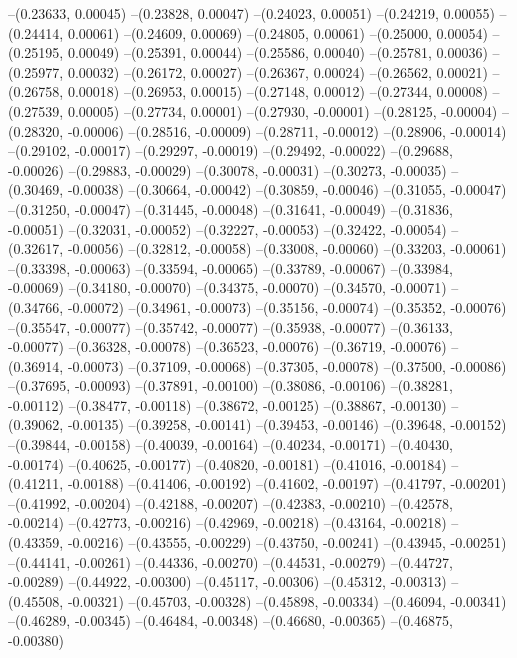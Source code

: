 --(0.23633, 0.00045)
--(0.23828, 0.00047)
--(0.24023, 0.00051)
--(0.24219, 0.00055)
--(0.24414, 0.00061)
--(0.24609, 0.00069)
--(0.24805, 0.00061)
--(0.25000, 0.00054)
--(0.25195, 0.00049)
--(0.25391, 0.00044)
--(0.25586, 0.00040)
--(0.25781, 0.00036)
--(0.25977, 0.00032)
--(0.26172, 0.00027)
--(0.26367, 0.00024)
--(0.26562, 0.00021)
--(0.26758, 0.00018)
--(0.26953, 0.00015)
--(0.27148, 0.00012)
--(0.27344, 0.00008)
--(0.27539, 0.00005)
--(0.27734, 0.00001)
--(0.27930, -0.00001)
--(0.28125, -0.00004)
--(0.28320, -0.00006)
--(0.28516, -0.00009)
--(0.28711, -0.00012)
--(0.28906, -0.00014)
--(0.29102, -0.00017)
--(0.29297, -0.00019)
--(0.29492, -0.00022)
--(0.29688, -0.00026)
--(0.29883, -0.00029)
--(0.30078, -0.00031)
--(0.30273, -0.00035)
--(0.30469, -0.00038)
--(0.30664, -0.00042)
--(0.30859, -0.00046)
--(0.31055, -0.00047)
--(0.31250, -0.00047)
--(0.31445, -0.00048)
--(0.31641, -0.00049)
--(0.31836, -0.00051)
--(0.32031, -0.00052)
--(0.32227, -0.00053)
--(0.32422, -0.00054)
--(0.32617, -0.00056)
--(0.32812, -0.00058)
--(0.33008, -0.00060)
--(0.33203, -0.00061)
--(0.33398, -0.00063)
--(0.33594, -0.00065)
--(0.33789, -0.00067)
--(0.33984, -0.00069)
--(0.34180, -0.00070)
--(0.34375, -0.00070)
--(0.34570, -0.00071)
--(0.34766, -0.00072)
--(0.34961, -0.00073)
--(0.35156, -0.00074)
--(0.35352, -0.00076)
--(0.35547, -0.00077)
--(0.35742, -0.00077)
--(0.35938, -0.00077)
--(0.36133, -0.00077)
--(0.36328, -0.00078)
--(0.36523, -0.00076)
--(0.36719, -0.00076)
--(0.36914, -0.00073)
--(0.37109, -0.00068)
--(0.37305, -0.00078)
--(0.37500, -0.00086)
--(0.37695, -0.00093)
--(0.37891, -0.00100)
--(0.38086, -0.00106)
--(0.38281, -0.00112)
--(0.38477, -0.00118)
--(0.38672, -0.00125)
--(0.38867, -0.00130)
--(0.39062, -0.00135)
--(0.39258, -0.00141)
--(0.39453, -0.00146)
--(0.39648, -0.00152)
--(0.39844, -0.00158)
--(0.40039, -0.00164)
--(0.40234, -0.00171)
--(0.40430, -0.00174)
--(0.40625, -0.00177)
--(0.40820, -0.00181)
--(0.41016, -0.00184)
--(0.41211, -0.00188)
--(0.41406, -0.00192)
--(0.41602, -0.00197)
--(0.41797, -0.00201)
--(0.41992, -0.00204)
--(0.42188, -0.00207)
--(0.42383, -0.00210)
--(0.42578, -0.00214)
--(0.42773, -0.00216)
--(0.42969, -0.00218)
--(0.43164, -0.00218)
--(0.43359, -0.00216)
--(0.43555, -0.00229)
--(0.43750, -0.00241)
--(0.43945, -0.00251)
--(0.44141, -0.00261)
--(0.44336, -0.00270)
--(0.44531, -0.00279)
--(0.44727, -0.00289)
--(0.44922, -0.00300)
--(0.45117, -0.00306)
--(0.45312, -0.00313)
--(0.45508, -0.00321)
--(0.45703, -0.00328)
--(0.45898, -0.00334)
--(0.46094, -0.00341)
--(0.46289, -0.00345)
--(0.46484, -0.00348)
--(0.46680, -0.00365)
--(0.46875, -0.00380)
